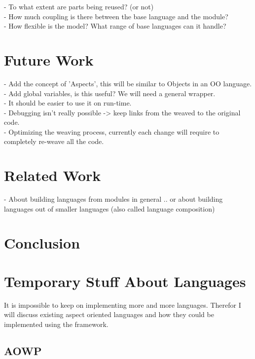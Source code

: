 \documentclass[a4paper]{report}
\begin{document}
- To what extent are parts being reused? (or not)\\
- How much coupling is there between the base language and the module?\\
- How flexible is the model? What range of base languages can it handle?

\chapter{Future Work}
- Add the concept of 'Aspects', this will be similar to Objects in an OO language.\\
- Add global variables, is this useful? We will need a general wrapper.\\
- It should be easier to use it on run-time.\\
- Debugging isn't really possible -> keep links from the weaved to the original code.\\
- Optimizing the weaving process, currently each change will require to completely re-weave all the code.\\
\chapter{Related Work}
- About building languages from modules in general .. or about building languages out of smaller languages (also called language composition)
\chapter{Conclusion}

\chapter{Temporary Stuff About Languages}
It is impossible to keep on implementing more and more languages. Therefor I will discuss existing aspect oriented languages and how they could be implemented using the framework.
\section{AOWP}
\end{document}
